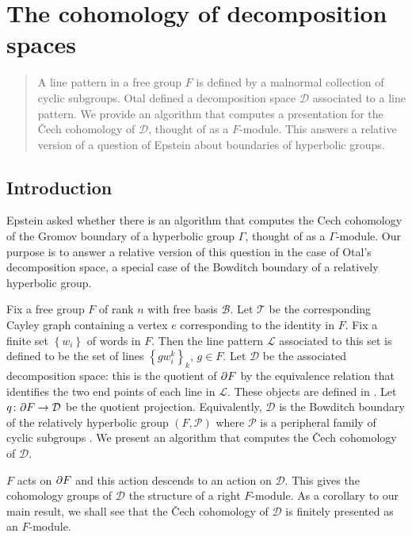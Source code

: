 \chapter{The cohomology of decomposition spaces}

\begin{abstract} A line pattern in a free group $F$ is defined by a malnormal
collection of cyclic subgroups. Otal defined a decomposition space
$\mathcal{D}$ associated to a line pattern. We provide an algorithm that
computes a presentation for the \v{C}ech cohomology of $\mathcal{D}$, thought
of as a $F$-module. This answers a relative version of a question of Epstein
about boundaries of hyperbolic groups. \end{abstract}

\section{Introduction}

Epstein asked whether there is an algorithm that computes the Cech cohomology
of the Gromov boundary of a hyperbolic group $\Gamma$, thought of as a
$\Gamma$-module.  Our purpose is to answer a relative version of this question
in the case of Otal's decomposition space, a special case of the Bowditch
boundary of a relatively hyperbolic group.

Fix a free group $F$ of rank $n$ with free basis $\mathcal{B}$. Let
$\mathcal{T}$ be the corresponding Cayley graph containing a vertex $e$
corresponding to the identity in $F$. Fix a finite set $\left\{w_i
\right\}$ of words in $F$. Then the line pattern $\mathcal{L}$ associated
to this set is defined to be the set of lines $\left\{gw_i^k\right\}_k$, $g
\in F$. Let $\mathcal{D}$ be the associated decomposition space: this is the
quotient of $\partial F$ by the equivalence relation that identifies the two
end points of each line in $\mathcal{L}$. These objects are defined in
\cite{otal92}. Let $q \colon \partial F \to \mathcal{D}$ be the quotient
projection. Equivalently, $\mathcal{D}$ is the Bowditch boundary of the
relatively hyperbolic group $(F, \mathcal{P})$ where $\mathcal{P}$ is a
peripheral family of cyclic subgroups \cite{Manning}. We present an algorithm
that computes the \v{C}ech cohomology of $\mathcal{D}$.

$F$ acts on $\partial F$ and this action descends to an action on
$\mathcal{D}$. This gives the cohomology groups of $\mathcal{D}$ the
structure of a right $F$-module. As a corollary to our main result, we shall
see that the \v{C}ech cohomology of $\mathcal{D}$ is finitely presented as an
$F$-module. 


